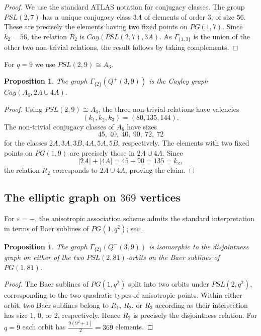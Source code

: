\documentclass{article}
\theoremstyle{plain}
\newtheorem{prop}[thm]{Proposition}
\begin{document}
\begin{proof}
We use the standard ATLAS notation for conjugacy classes. The group
$PSL(2,7)$ has a unique conjugacy class $3A$ of elements of order $3$, of size $56$. These are precisely the elements having two fixed points on $PG(1,7)$. Since $k_2=56$, the relation $R_2$ is $Cay(PSL(2,7),3A)$. As $\Gamma_{\{1,3\}}$ is the union of the other two non-trivial relations, the result follows by taking complements.
\end{proof}

For $q=9$ we use $PSL(2,9)\cong A_6$. 
\begin{prop}
The graph $\Gamma_{\{2\}}(Q^+(3,9))$ is the Cayley graph $Cay(A_6,2A\cup4A)$.
\end{prop}

\begin{proof}
Using $PSL(2,9)\cong A_6$, the three non-trivial relations have valencies
\[
(k_1,k_2,k_3)=(80,135,144).
\]
The non-trivial conjugacy classes of $A_6$ have sizes
\[
45,\ 40,\ 40,\ 90,\ 72,\ 72
\]
for the classes $2A,3A,3B,4A,5A,5B$, respectively. The elements with two fixed points on $PG(1,9)$ are precisely those in $2A\cup4A$.
Since
\[
|2A|+|4A|=45+90=135=k_2,
\]
the relation $R_2$ corresponds to $2A\cup4A$, proving the claim.
\end{proof}

\subsection{The elliptic graph on $369$ vertices}

For $\varepsilon=-$, the anisotropic association scheme admits the standard interpretation in terms of Baer sublines of $PG(1,q^2)$; see \cite[Remark~4.20]{AdriaensenDeBoeck2025}.

\begin{prop}
The graph $\Gamma_{\{2\}}(Q^-(3,9))$ is isomorphic to the disjointness graph on either of the two $PSL(2,81)$-orbits on the Baer sublines of $PG(1,81)$.
\end{prop}

\begin{proof}
The Baer sublines of $PG(1,q^2)$ split into two orbits under $PSL(2,q^2)$, corresponding to the two quadratic types of anisotropic points. Within either orbit, two Baer sublines belong to $R_1$, $R_2$, or $R_3$ according as their intersection has size $1$, $0$, or $2$, respectively. Hence $R_2$ is precisely the disjointness relation.
For $q=9$ each orbit has $\frac{9(9^2+1)}2=369$ elements.
\end{proof}
\end{document}
